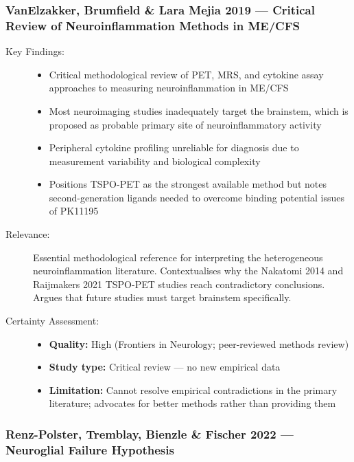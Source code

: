 \subsubsection*{VanElzakker, Brumfield \& Lara Mejia 2019 --- Critical Review of Neuroinflammation Methods in ME/CFS}


\begin{description}
    \item[Key Findings:]
    \begin{itemize}
        \item Critical methodological review of PET, MRS, and cytokine assay approaches to measuring neuroinflammation in ME/CFS
        \item Most neuroimaging studies inadequately target the brainstem, which is proposed as probable primary site of neuroinflammatory activity
        \item Peripheral cytokine profiling unreliable for diagnosis due to measurement variability and biological complexity
        \item Positions TSPO-PET as the strongest available method but notes second-generation ligands needed to overcome binding potential issues of PK11195
    \end{itemize}
    \item[Relevance:] Essential methodological reference for interpreting the heterogeneous neuroinflammation literature. Contextualises why the Nakatomi 2014 and Raijmakers 2021 TSPO-PET studies reach contradictory conclusions. Argues that future studies must target brainstem specifically.
    \item[Certainty Assessment:]
    \begin{itemize}
        \item \textbf{Quality:} High (Frontiers in Neurology; peer-reviewed methods review)
        \item \textbf{Study type:} Critical review --- no new empirical data
        \item \textbf{Limitation:} Cannot resolve empirical contradictions in the primary literature; advocates for better methods rather than providing them
    \end{itemize}
\end{description}

\subsubsection*{Renz-Polster, Tremblay, Bienzle \& Fischer 2022 --- Neuroglial Failure Hypothesis}

